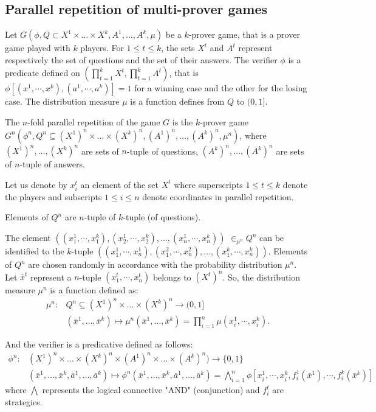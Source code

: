 \subsection{Parallel repetition of multi-prover games}

Let $G(\phi, Q \subset X^1 \times \ldots \times X^k, A^1, \ldots, A^k, \mu)$ be a $k$-prover game, that is a prover game played with $k$ players. For $1 \leq t \leq k$, the sets $X^t$ and $A^t$ represent respectively the set of questions and the set of their answers. The verifier $\phi$ is a predicate  defined on $\left( \prod\limits_{t=1}^k X^t, \prod\limits_{t=1}^k A^t \right)$, that is $\phi [(x^1, \cdots , x^k),(a^1, \cdots , a^k)]=1$ for a winning case and  the other for the losing case. The distribution measure $\mu$ is a function defines from $Q$ to $(0,1].$

The $n$-fold parallel repetition of the game $G$ is the $k$-prover game $G^n(\phi^n, Q^n \subseteq (X^1)^n \times \ldots \times (X^k)^n, (A^1)^n, \ldots,( A^k)^n, \mu^n)$, where  $(X^1)^n , \ldots, (X^k)^n$ are sets of $n$-tuple of questions, $(A^k)^n , \ldots, (A^k)^n$ are sets of $n$-tuple of answers. 

Let us denote by $x_i^t$ an element of the set $X^t$ where superscripts $1\leq t \leq k$   denote the players and subscripts $1 \leq i \leq n$  denote  coordinates in parallel repetition.

Elements of $Q^n$ are $n$-tuple of $k$-tuple (of questions). 

The element $((x_1^1, \cdots , x_1^k), (x_2^1, \cdots , x_2^k),\ldots, (x_n^1, \cdots , x_n^k))$ $ \in_{\mu^n} Q^n$ can be identified to the $k$-tuple $((x_1^1, \cdots , x_n^1), (x_1^2, \cdots , x_n^2),\ldots, (x_1^k, \cdots , x_n^k))$. Elements of $Q^n$ are chosen randomly  in accordance with the probability distribution $\mu^n$. Let $\bar{x}^t$ represent a $n$-tuple $(x_1^t, \cdots , x_n^t)$ belongs to $(X^t)^n$.
So, the distribution measure $\mu^n$ is a function defined as:
\begin{align*}
\mu^n:  & Q^n \subseteq (X^1)^n \times \ldots \times (X^k)^n   \longrightarrow (0,1] \\
  & (\bar{x}^1,\ldots, \bar{x}^k) \longmapsto \mu^n(\bar{x}^1,\ldots, \bar{x}^k)=\prod_{i=1}^n  \mu (x_i^1, \cdots , x_i^k). 
 \end{align*}

And  the verifier is a predicative defined as follows:
\begin{align*}
\phi^n: &(X^1)^n \times \ldots \times (X^k)^n \times (A^1)^n \times \ldots \times ( A^k)^n)  \longrightarrow  \{0,1\}\\ 
& (\bar{x}^1,\ldots, \bar{x}^k,\bar{a}^1, \ldots, \bar{a}^k)  \longmapsto  \phi^n (\bar{x}^1,\ldots, \bar{x}^k,\bar{a}^1, \ldots, \bar{a}^k) = \bigwedge\limits_{i=1}^n \phi [x_i^1, \cdots , x_i^k, f_i^1(\bar{x}^1), \cdots ,  f_i^k(\bar{x}^k)]
\end{align*}
where $\bigwedge$ represents the logical connective "AND" (conjunction) and $f_i^t$ are strategies.

